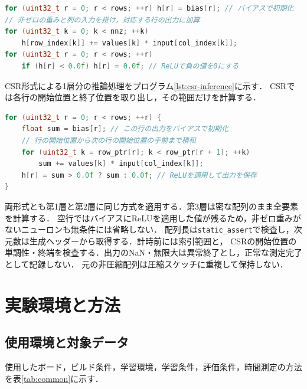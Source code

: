 \documentclass[a4paper,11pt]{article}
\newcommand{\code}[1]{\nolinkurl{#1}}
\begin{document}
\begin{lstlisting}[language=C++,texcl=true,commentstyle=\upshape,caption={COO形式による1層分の推論処理},label={lst:coo-inference}]
for (uint32_t r = 0; r < rows; ++r) h[r] = bias[r]; // バイアスで初期化
// 非ゼロの重みと列の入力を掛け，対応する行の出力に加算
for (uint32_t k = 0; k < nnz; ++k)
    h[row_index[k]] += values[k] * input[col_index[k]];
for (uint32_t r = 0; r < rows; ++r)
    if (h[r] < 0.0f) h[r] = 0.0f; // ReLUで負の値を0にする
\end{lstlisting}
%
CSR形式による1層分の推論処理をプログラム\ref{lst:csr-inference}に示す．
CSRでは各行の開始位置と終了位置を取り出し，その範囲だけを計算する．

\begin{lstlisting}[language=C++,texcl=true,commentstyle=\upshape,caption={CSR形式による1層分の推論処理},label={lst:csr-inference}]
for (uint32_t r = 0; r < rows; ++r) {
    float sum = bias[r]; // この行の出力をバイアスで初期化
    // 行の開始位置から次の行の開始位置の手前まで積和
    for (uint32_t k = row_ptr[r]; k < row_ptr[r + 1]; ++k)
        sum += values[k] * input[col_index[k]];
    h[r] = sum > 0.0f ? sum : 0.0f; // ReLUを適用して出力を保存
}
\end{lstlisting}
%
両形式とも第1層と第2層に同じ方式を適用する．第3層は密な配列のまま全要素を計算する．
空行ではバイアスにReLUを適用した値が残るため，非ゼロ重みがないニューロンも無条件には省略しない．
配列長は\code{static_assert}で検査し，次元数は生成ヘッダーから取得する．計時前には索引範囲と，
CSRの開始位置の単調性・終端を検査する．出力のNaN・無限大は異常終了とし，正常な測定完了として記録しない．
元の非圧縮配列は圧縮スケッチに重複して保持しない．

\section{実験環境と方法}
\subsection{使用環境と対象データ}
使用したボード，ビルド条件，学習環境，学習条件，評価条件，時間測定の方法を表\ref{tab:common}に示す．
\end{document}

